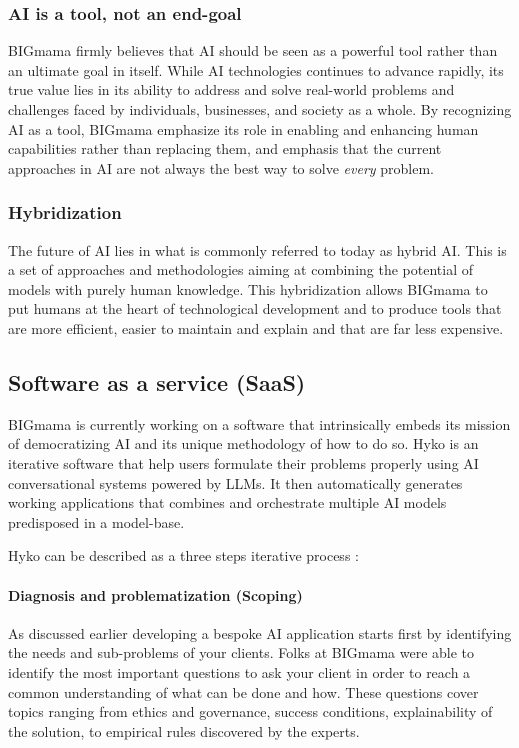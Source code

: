 \documentclass[a4paper,12pt]{article}
\begin{document}
\subsubsection{AI is a tool, not an end-goal}
BIGmama firmly believes that AI should be seen as a powerful tool rather than an ultimate goal in itself. While AI technologies continues to advance rapidly, 
its true value lies in its ability to address and solve real-world problems and challenges faced by individuals, businesses, and society as a whole.
By recognizing AI as a tool, BIGmama emphasize its role in enabling and enhancing human capabilities rather than replacing them, and emphasis that the current 
approaches in AI are not always the best way to solve \textit{every} problem.

\subsubsection{Hybridization}
The future of AI lies in what is commonly referred to today as hybrid AI. 
This is a set of approaches and methodologies aiming at combining the potential of models with purely human knowledge. 
This hybridization allows BIGmama to put humans at the heart of technological development and to produce tools that are more efficient, easier to maintain and 
explain and that are far less expensive.

\subsection{Software as a service (SaaS)}
BIGmama is currently working on a software that intrinsically embeds its mission of democratizing AI and its unique methodology of how to do so. 
Hyko is an iterative software that help users formulate their problems properly using AI conversational systems powered by LLMs. 
It then automatically generates working applications that combines and orchestrate multiple AI models predisposed in a model-base.

Hyko can be described as a three steps iterative process :

\paragraph{Diagnosis and problematization (Scoping)}
As discussed earlier developing a bespoke AI application starts first by identifying the needs and sub-problems of your clients. 
Folks at BIGmama were able to identify the most important questions to ask your client in order to reach a common understanding of what can be done and how.
These questions cover topics ranging from ethics and governance, success conditions, explainability of the solution, to empirical rules discovered by the experts.
\end{document}
